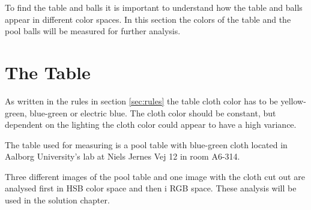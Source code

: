 To find the table and balls it is important to understand how the table and balls appear in different color spaces. In this section the colors of the table and the pool balls will be measured for further analysis.

\section{The Table}
As written in the rules in section \ref{sec:rules} the table cloth color has to be yellow-green, blue-green or electric blue. The cloth color should be constant, but dependent on the lighting the cloth color could appear to have a high variance.

The table used for measuring is a pool table with blue-green cloth located in Aalborg University's lab at Niels Jernes Vej 12 in room A6-314.

Three different images of the pool table and one image with the cloth cut out are analysed first in HSB color space and then i RGB space. These analysis will be used in the solution chapter.

